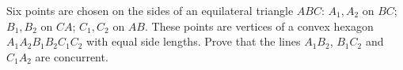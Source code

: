 Six points are chosen on the sides of an equilateral triangle $ABC$: $A_1, A_2$ on $BC$; $B_1, B_2$ on $CA$; $C_1, C_2$ on $AB$. These points are vertices of a convex hexagon $A_1 A_2 B_1 B_2 C_1 C_2$ with equal side lengths. Prove that the lines $A_1 B_2$, $B_1 C_2$ and $C_1 A_2$ are concurrent.
